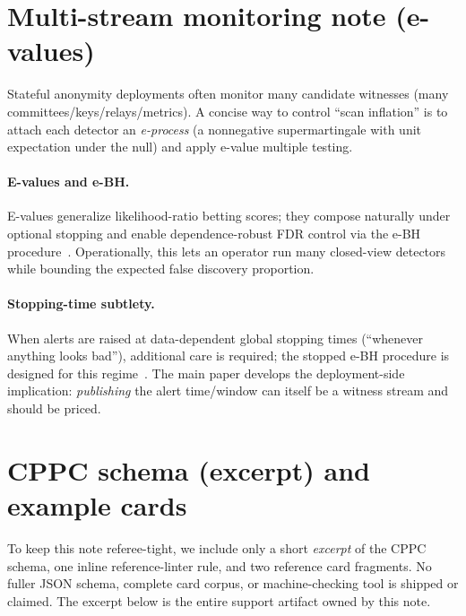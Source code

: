 \documentclass[11pt]{article}
\theoremstyle{definition}
\theoremstyle{remark}
\begin{document}
\appendix


\section{Multi-stream monitoring note (e-values)}
\label{app:multi}
Stateful anonymity deployments often monitor many candidate witnesses (many committees/keys/relays/metrics).
A concise way to control ``scan inflation'' is to attach each detector an \emph{e-process} (a nonnegative supermartingale with unit expectation under the null) and apply e-value multiple testing.

\paragraph{E-values and e-BH.}
E-values generalize likelihood-ratio betting scores; they compose naturally under optional stopping and enable dependence-robust FDR control via the e-BH procedure~\cite{ramdas2024evalues,wang2022ebh}.
Operationally, this lets an operator run many closed-view detectors while bounding the expected false discovery proportion.

\paragraph{Stopping-time subtlety.}
When alerts are raised at data-dependent global stopping times (``whenever anything looks bad''), additional care is required; the stopped e-BH procedure is designed for this regime~\cite{wang2025sebH}.
The main paper develops the deployment-side implication: \emph{publishing} the alert time/window can itself be a witness stream and should be priced.\cite{series:state3}



\section{CPPC schema (excerpt) and example cards}
\label{app:cppc}
To keep this note referee-tight, we include only a short \emph{excerpt} of the CPPC schema, one inline reference-linter rule, and two reference card fragments.
No fuller JSON schema, complete card corpus, or machine-checking tool is shipped or claimed.  The excerpt below is the entire support artifact owned by this note.
\end{document}
